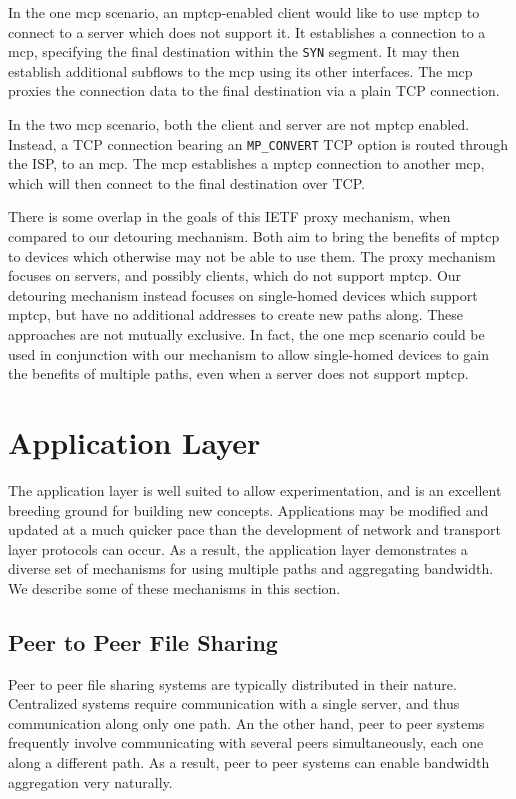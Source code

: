 \documentclass{cwru}
\begin{document}
In the one \ac{mcp} scenario, an \ac{mptcp}-enabled client would like to use
\ac{mptcp} to connect to a server which does not support it. It establishes a
connection to a \ac{mcp}, specifying the final destination within the
\texttt{SYN} segment. It may then establish additional subflows to the \ac{mcp}
using its other interfaces. The \ac{mcp} proxies the connection data to the
final destination via a plain TCP connection.

In the two \ac{mcp} scenario, both the client and server are not \ac{mptcp}
enabled. Instead, a TCP connection bearing an \texttt{MP\_CONVERT} TCP option is
routed through the ISP, to an \ac{mcp}. The \ac{mcp} establishes a \ac{mptcp}
connection to another \ac{mcp}, which will then connect to the final destination
over TCP.

There is some overlap in the goals of this IETF proxy mechanism, when compared
to our detouring mechanism. Both aim to bring the benefits of \ac{mptcp} to
devices which otherwise may not be able to use them. The proxy mechanism focuses
on servers, and possibly clients, which do not support \ac{mptcp}. Our detouring
mechanism instead focuses on single-homed devices which support \ac{mptcp}, but
have no additional addresses to create new paths along. These approaches are not
mutually exclusive. In fact, the one \ac{mcp} scenario could be used in
conjunction with our mechanism to allow single-homed devices to gain the
benefits of multiple paths, even when a server does not support \ac{mptcp}.

\section{Application Layer}

The application layer is well suited to allow experimentation, and is an
excellent breeding ground for building new concepts. Applications may be
modified and updated at a much quicker pace than the development of network and
transport layer protocols can occur. As a result, the application layer
demonstrates a diverse set of mechanisms for using multiple paths and
aggregating bandwidth. We describe some of these mechanisms in this section.

\subsection{Peer to Peer File Sharing}

Peer to peer file sharing systems are typically distributed in their nature.
Centralized systems require communication with a single server, and thus
communication along only one path. An the other hand, peer to peer systems
frequently involve communicating with several peers simultaneously, each one
along a different path. As a result, peer to peer systems can enable bandwidth
aggregation very naturally.
\end{document}
